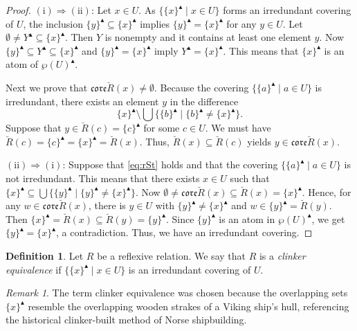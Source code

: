 \documentclass[11pt,a4paper]{amsart}
\newcommand{\UP}{\blacktriangle}
\theoremstyle{plain}
\theoremstyle{definition}
\newtheorem{definition}[theorem]{Definition}
\theoremstyle{remark}
\newtheorem{remark}[theorem]{Remark}
\numberwithin{equation}{section}
\begin{document}
\begin{proof}
$\mathrm{(i)}\Rightarrow\mathrm{(ii)}$: Let $x \in U$.
As $\{ \{x\}^\UP \mid x \in U\}$ forms an irredundant 
covering of $U$, the inclusion 
$\{y\}^\UP \subseteq\{x\}^\UP$ implies 
$\{y\}^\UP = \{x\}^\UP$  for any $y \in U$.
Let $\emptyset \neq Y^\UP \subseteq \{x\}^\UP$. Then $Y$ is nonempty
and it contains at least one element $y$.
Now $\{y\}^\UP \subseteq Y^\UP \subseteq \{x\}^\UP$ and 
$\{y\}^\UP = \{x\}^\UP$ imply $Y^\UP = \{x\}^\UP$. This means that $\{x\}^\UP$ is an atom of $\wp(U)^\UP$.

Next we prove that 
$\mathfrak{core}\breve{R}(x) \neq \emptyset$.
Because the covering 
$\{ \{a\}^\UP \mid a \in U\}$ is irredundant,
there exists an element $y$ in the difference
\[
\{x\}^\UP \setminus   
\bigcup \{\{b\}^\UP \mid \{b\}^\UP \neq\{x\}^\UP\}.
\]
Suppose that $y \in \breve{R}(c) = \{c\}^\UP$
for some $c \in U$. We must have 
$\breve{R}(c) = \{c\}^\UP = \{x\}^\UP = \breve{R}(x)$.
Thus, $\breve{R}(x) \subseteq \breve{R}(c)$ yields 
$y \in \mathfrak{core}\breve{R}(x)$.


\medskip\noindent%
$\mathrm{(ii)}\Rightarrow\mathrm{(i)}$: 
Suppose that \eqref{eq:rSt} holds and 
that the covering $\{ \{a\}^\UP \mid a \in U\}$ is 
not irredundant. This means that there exists $x \in U$
such that 
$\{x\}^\UP \subseteq \bigcup\{\{y\}^\UP \mid \{y\}^\UP \neq\{x\}^\UP\}$. 
Now $\emptyset\neq\mathfrak{core}\breve{R}(x) \subseteq\breve{R}(x)
= \{x\}^\UP$. Hence, for any $w \in \mathfrak{core}\breve{R}(x)$,
there is $y\in U$ with $\{y\}^\UP \neq \{x\}^\UP$
and $w\in \{y\}^\UP = \breve{R}(y)$. Then $\{x\}^\UP = \breve{R}(x) 
\subseteq \breve{R}(y) = \{y\}^\UP$. Since
$\{y\}^\UP$ is an atom in $\wp(U)^\UP$, we get
$\{y\}^\UP = \{x\}^\UP$, a contradiction. Thus,
we have an irredundant covering.
\end{proof}



\begin{definition} \label{def:clinker}
Let $R$ be a reflexive relation. We say that
$R$ is a \emph{clinker equivalence} if 
$\{ \{x\}^\UP \mid x \in U\}$ is an irredundant covering of $U$.
\end{definition}

\begin{remark}
The term clinker equivalence was chosen because the overlapping sets $\{x\}^\UP$ resemble the overlapping wooden strakes of a Viking ship's hull, referencing the historical clinker-built method of Norse shipbuilding.
\end{remark}
\end{document}
